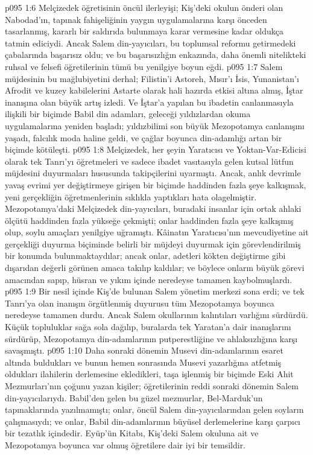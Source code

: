 \vs p095 1:6 Melçizedek öğretisinin öncül ilerleyişi; Kiş’deki okulun önderi olan Nabodad’ın, tapınak fahişeliğinin yaygın uygulamalarına karşı önceden tasarlanmış, kararlı bir saldırıda bulunmaya karar vermesine kadar oldukça tatmin ediciydi. Ancak Salem din\hyp{}yayıcıları, bu toplumsal reformu getirmedeki çabalarında başarısız oldu; ve bu başarısızlığın enkazında, daha önemli nitelikteki ruhsal ve felsefi öğretilerinin tümü bu yenilgiye boyun eğdi.
\vs p095 1:7 Salem müjdesinin bu mağlubiyetini derhal; Filistin’i Astoreh, Mısır’ı İsis, Yunanistan’ı Afrodit ve kuzey kabilelerini Astarte olarak hali hazırda etkisi altına almış, İştar inanışına olan büyük artış izledi. Ve İştar’a yapılan bu ibadetin canlanmasıyla ilişkili bir biçimde Babil din adamları, geleceği yıldızlardan okuma uygulamalarına yeniden başladı; yıldızbilimi son büyük Mezopotamya canlanışını yaşadı, falcılık moda haline geldi, ve çağlar boyunca din\hyp{}adamlığı artan bir biçimde kötüleşti.
\vs p095 1:8 Melçizedek, her şeyin Yaratıcısı ve Yoktan\hyp{}Var\hyp{}Edicisi olarak tek Tanrı’yı öğretmeleri ve sadece ibadet vasıtasıyla gelen kutsal lütfun müjdesini duyurmaları hususunda takipçilerini uyarmıştı. Ancak, anlık devrimle yavaş evrimi yer değiştirmeye girişen bir biçimde haddinden fazla şeye kalkışmak, yeni gerçekliğin öğretmenlerinin sıklıkla yaptıkları hata olagelmiştir. Mezopotamya’daki Melçizedek din\hyp{}yayıcıları, buradaki insanlar için ortak ahlaki ölçütü haddinden fazla yükseğe çekmişti; onlar haddinden fazla şeye kalkışmış olup, soylu amaçları yenilgiye uğramıştı. Kâinatın Yaratıcısı’nın mevcudiyetine ait gerçekliği duyurma biçiminde belirli bir müjdeyi duyurmak için görevlendirilmiş bir konumda bulunmaktaydılar; ancak onlar, adetleri kökten değiştirme gibi dışarıdan değerli görünen amaca takılıp kaldılar; ve böylece onların büyük görevi amacından sapıp, hüsran ve yıkım içinde neredeyse tamamen kaybolmuşlardı.
\vs p095 1:9 Bir nesil içinde Kiş’de bulunan Salem yönetim merkezi sona erdi; ve tek Tanrı’ya olan inanışın örgütlenmiş duyurusu tüm Mezopotamya boyunca neredeyse tamamen durdu. Ancak Salem okullarının kalıntıları varlığını sürdürdü. Küçük topluluklar sağa sola dağılıp, buralarda tek Yaratan’a dair inanışlarını sürdürüp, Mezopotamya din\hyp{}adamlarının putperestliğine ve ahlaksızlığına karşı savaşmıştı.
\vs p095 1:10 Daha sonraki dönemin Musevi din\hyp{}adamlarının esaret altında buldukları ve bunun hemen sonrasında Musevi yazarlığına atfetmiş oldukları ilahilerin derlemesine ekledikleri, taşa işlenmiş bir biçimde Eski Ahit Mezmurları’nın çoğunu yazan kişiler; öğretilerinin reddi sonraki dönemin Salem din\hyp{}yayıcılarıydı. Babil’den gelen bu güzel mezmurlar, Bel\hyp{}Marduk’un tapınaklarında yazılmamıştı; onlar, öncül Salem din\hyp{}yayıcılarından gelen soyların çalışmasıydı; ve onlar, Babil din\hyp{}adamlarının büyüsel derlemelerine karşı çarpıcı bir tezatlık içindedir. Eyüp’ün Kitabı, Kiş’deki Salem okuluna ait ve Mezopotamya boyunca var olmuş öğretilere dair iyi bir temsildir.
